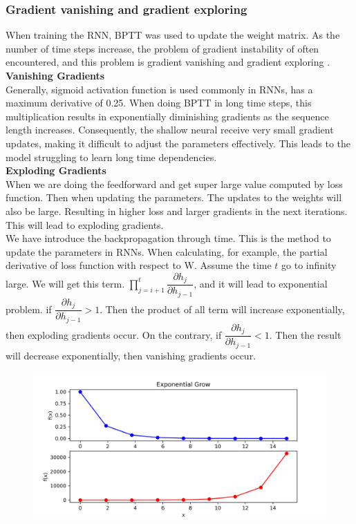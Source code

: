 \documentclass[12pt,a4paper]{article}
\begin{document}
\subsubsection{Gradient vanishing and gradient exploring}
When training the RNN, BPTT was used to update the weight matrix. As the number of time steps increase, the problem of gradient instability of often encountered, and this problem is gradient vanishing and gradient exploring \parencite{bengio1994learning}. 
\\[2ex]
\textbf{Vanishing Gradients}
\\[1ex]
Generally, sigmoid activation function is used commonly in RNNs, has a maximum derivative of 0.25. When doing BPTT in long time steps, this multiplication results in exponentially diminishing gradients as the sequence length increases. Consequently, the shallow neural receive very small gradient updates, making it difficult to adjust the parameters effectively. This leads to the model struggling to learn long time dependencies. 
\\[1ex]
\textbf{Exploding Gradients}
\\[1ex]
When we are doing the feedforward and get super large value computed by loss function. Then when updating the parameters. The updates to the weights will also be large. Resulting in higher loss and larger gradients in the next iterations. This will lead to exploding gradients.
\\[1ex]
We have introduce the backpropagation through time. This is the method to update the parameters in RNNs. When calculating, for example, the partial derivative of loss function with respect to W. Assume the time $t$ go to infinity large. We will get this term. $ \prod_{j=i+1}^{t} \dfrac{\partial h_j}{\partial h_{j-1}} $, and it will lead to exponential problem. if $ \dfrac{\partial h_j}{\partial h_{j-1}} > 1 $. Then the product of all term will increase exponentially, then exploding gradients occur. On the contrary, if $\dfrac{\partial h_j}{\partial h_{j-1}} < 1$. Then the result will decrease exponentially, then vanishing gradients occur.
\begin{figure}[!h]
    \centering
    \includegraphics[width=1\textwidth]{../Pic/exponential_growth.png} %
\end{figure}
\end{document}
